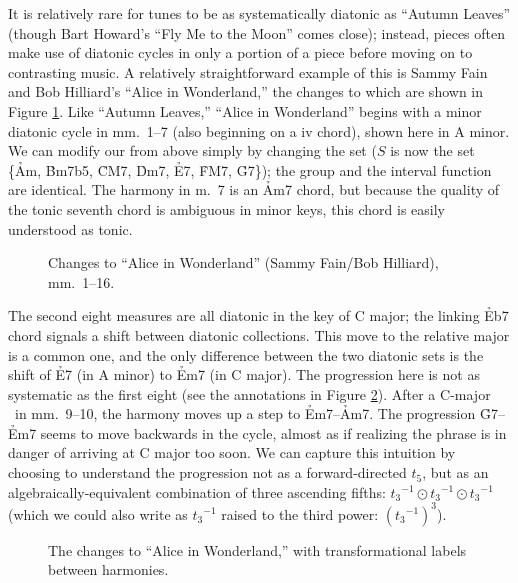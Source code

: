 It is relatively rare for tunes to be as systematically diatonic as “Autumn
Leaves” (though Bart Howard’s “Fly Me to the Moon” comes close); instead,
pieces often make use of diatonic cycles in only a portion of a piece before
moving on to contrasting music. A relatively straightforward example of this
is Sammy Fain and Bob Hilliard’s “Alice in Wonderland,” the changes to which
are shown in Figure \ref{ds:wonderland-changes}. Like “Autumn
Leaves,” “Alice in Wonderland” begins with a minor diatonic cycle in mm.~1--7
(also beginning on a iv chord), shown here in A minor. We can modify our \gis{}
from above simply by changing the set ($S$ is now the set \{\h{Am}, \h{Bm7b5},
\h{CM7}, \h{Dm7}, \h{E7}, \h{FM7}, \h{G7}\}); the group \ivls{} and the
interval function are identical. The harmony in m.~7 is an \h{Am7} chord,
but because the quality of the tonic seventh chord is ambiguous in minor
keys, this chord is easily understood as tonic.

\begin{figure}[htbp]
  \caption{Changes to “Alice in Wonderland” (Sammy Fain/Bob Hilliard), mm.\
  1--16.}
  \label{ds:wonderland-changes}
\end{figure}

The second eight measures are all diatonic in the key of C major; the linking
\h{Eb7} chord signals a shift between diatonic collections.\fn{ds-14} This
move to the relative major is a common one, and the only difference between
the two diatonic sets is the shift of \h{E7} (in A minor) to \h{Em7} (in C
major). The progression here is not as systematic as the first eight (see the
annotations in Figure \ref{ds:wonderland-transformations}). After a C-major
\tf\ in mm.~9--10, the harmony moves up a step to \h{Em7}--\h{Am7}.
The progression \h{G7}--\h{Em7} seems to move backwards in the cycle, almost
as if realizing the phrase is in danger of arriving at C major too soon. We
can capture this intuition by choosing to understand the progression not as a
forward-directed $t_5$, but as an algebraically-equivalent combination of
three ascending fifths: ${t_3}^{-1} \odot {t_3}^{-1} \odot {t_3}^{-1}$ (which
we could also write as ${t_3}^{-1}$ raised to the third power: ${({t_3}^{-1})}^3$).

\begin{figure}[h!btp]
  \caption{The changes to “Alice in Wonderland,” with transformational labels
  between harmonies.}
  \label{ds:wonderland-transformations}
\end{figure}

